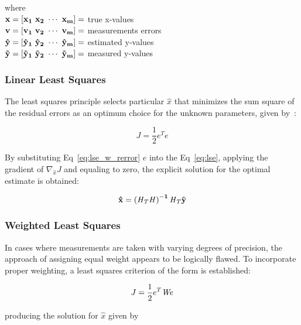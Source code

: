 where \\

$\bf{x} = \left[ x_{1} ~ x_{2} ~ \cdots ~ x_{m} \right] = $ true x-values \\

$\bf{v} = \left[ v_{1} ~ v_{2} ~ \cdots ~ v_{m} \right] = $ measurements errors \\

$\bf{\hat{y}} = \left[ \hat{y}_{1} ~ \hat{y}_{2} ~ \cdots ~ \hat{y}_{m} \right] = $ estimated y-values \\

$\bf{\tilde{y}} = \left[ \tilde{y}_{1} ~ \tilde{y}_{2} ~ \cdots ~ \tilde{y}_{m} \right] = $ measured y-values \\

\subsubsection{Linear Least Squares}
The least squares principle selects particular $\hat{x}$ that minimizes the sum square of the residual errors as an optimum choice for the unknown parameters, given by~\cite{crassidis2004dynamic}:

\begin{equation}
    J = \frac{1}{2} e^{T} e
    \label{eq:lse}
\end{equation}

By substituting Eq~\ref{eq:lse_w_rerror} $e$ into the Eq~\ref{eq:lse}, applying the gradient of $\nabla_{\hat{x}} J$ and equaling to zero, the explicit solution for the optimal estimate is obtained:

\begin{equation}
    \bf{\hat{x}} = \left(\it{H}_{T} \it{H}\right)^{-1} \it{H}_{T} \bf{\tilde{y}}
\end{equation}


\subsubsection{Weighted Least Squares}
In cases where measurements are taken with varying degrees of precision, the approach of assigning equal weight appears to be logically flawed. To incorporate proper weighting, a least squares criterion of the form is established:

\begin{equation}
    J = \frac{1}{2} e^{T} \it{W} e
    \label{eq:wlse}
\end{equation}

producing the solution for $\hat{x}$ given by

